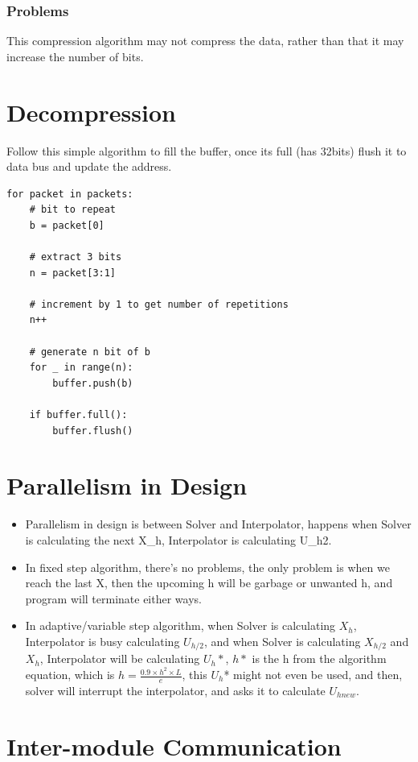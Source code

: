 \documentclass[12pt]{report}
\begin{document}
\subsubsection{Problems}
This compression algorithm may not compress the data, rather than that it may increase the number of bits.

\section{Decompression}
Follow this simple algorithm to fill the buffer, once its full (has 32bits) flush it to data bus and update the address.

\begin{verbatim}
for packet in packets:
    # bit to repeat
    b = packet[0]

    # extract 3 bits
    n = packet[3:1]

    # increment by 1 to get number of repetitions
    n++

    # generate n bit of b
    for _ in range(n):
        buffer.push(b)

    if buffer.full():
        buffer.flush()
\end{verbatim}
        
\section{Parallelism in Design}   
\begin{itemize}
    \item Parallelism in design is between Solver and Interpolator, happens when Solver is calculating the next X\_h, Interpolator is calculating U\_h2.
    \item In fixed step algorithm, there's no problems, the only problem is when we reach the last X, then the upcoming h will be garbage or unwanted h, and program will terminate either ways.
    \item In adaptive/variable step algorithm, when Solver is calculating $X_h$, Interpolator is busy calculating $U_{h/2}$, and when Solver is calculating $X_{h/2}$ and $X_{h}$, Interpolator will be calculating $U_{h}*$, $h*$ is the h from the algorithm equation, which is $h = \frac{0.9 \times h^2 \times L}{e}$, this $U_{h}$* might not even be used, and then, solver will interrupt the interpolator, and asks it to calculate $U_{hnew}$.
\end{itemize}

\section{Inter-module Communication}
\end{document}
